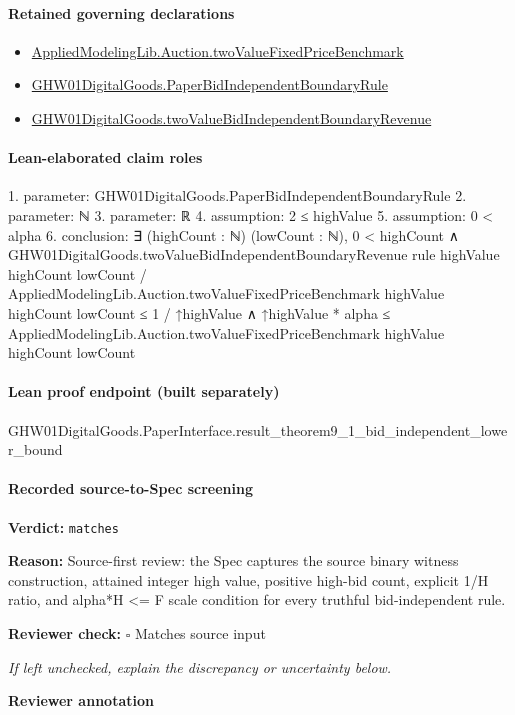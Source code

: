 \documentclass[10pt]{article}
\newcommand{\reviewerbox}{%
  \par\noindent\fbox{\parbox{0.96\linewidth}{\rule{0pt}{0.38in}}}\par
}
\newcommand{\reviewmatch}[1]{%
  \par\noindent\textbf{Reviewer check:} $\square$\; #1\par
  \noindent\emph{If left unchecked, explain the discrepancy or uncertainty below.}\par
}
\begin{document}
\paragraph{Retained governing declarations}
\begin{itemize}\raggedright
\item \hyperlink{governing-declaration-88cfb020550f5fda}{Applied\allowbreak{}Modeling\allowbreak{}Lib.\allowbreak{}Auction.\allowbreak{}two\allowbreak{}Value\allowbreak{}Fixed\allowbreak{}Price\allowbreak{}Benchmark}
\item \hyperlink{governing-declaration-02f98bee2ca3e61e}{GHW01\allowbreak{}Digital\allowbreak{}Goods.\allowbreak{}Paper\allowbreak{}Bid\allowbreak{}Independent\allowbreak{}Boundary\allowbreak{}Rule}
\item \hyperlink{governing-declaration-0255a09134fe5a57}{GHW01\allowbreak{}Digital\allowbreak{}Goods.\allowbreak{}two\allowbreak{}Value\allowbreak{}Bid\allowbreak{}Independent\allowbreak{}Boundary\allowbreak{}Revenue}
\end{itemize}
\paragraph{Lean-elaborated claim roles}\begin{ReviewVerbatim}
1. parameter: GHW01DigitalGoods.PaperBidIndependentBoundaryRule
2. parameter: ℕ
3. parameter: ℝ
4. assumption: 2 ≤ highValue
5. assumption: 0 < alpha
6. conclusion: ∃ (highCount : ℕ) (lowCount : ℕ),
  0 < highCount ∧
    GHW01DigitalGoods.twoValueBidIndependentBoundaryRevenue rule highValue highCount lowCount /
          AppliedModelingLib.Auction.twoValueFixedPriceBenchmark highValue highCount lowCount ≤
        1 / ↑highValue ∧
      ↑highValue * alpha ≤ AppliedModelingLib.Auction.twoValueFixedPriceBenchmark highValue highCount lowCount
\end{ReviewVerbatim}

\paragraph{Lean proof endpoint (built separately)}\begin{ReviewVerbatim}
GHW01DigitalGoods.PaperInterface.result_theorem9_1_bid_independent_lower_bound
\end{ReviewVerbatim}

\paragraph{Recorded source-to-Spec screening}
\textbf{Verdict:} \texttt{matches}
\\
{\raggedright
\textbf{Reason:} Source-\allowbreak{}first review:\allowbreak{} the Spec captures the source binary witness construction, attained integer high value, positive high-\allowbreak{}bid count, explicit 1/\allowbreak{}H ratio, and alpha*H <= F scale condition for every truthful bid-\allowbreak{}independent rule.\allowbreak{}
\par}
\reviewmatch{Matches source input}
\noindent\textbf{Reviewer annotation}\par
\reviewerbox
\clearpage
\hypertarget{source-claim-60df12d3b02570ba}{}
\end{document}
